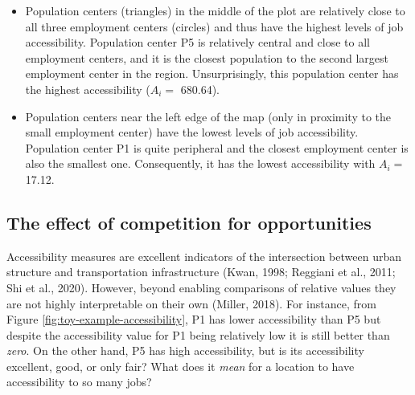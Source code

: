 \documentclass[]{elsarticle} %
\begin{document}
\begin{itemize}
\item
  Population centers (triangles) in the middle of the plot are
  relatively close to all three employment centers (circles) and thus
  have the highest levels of job accessibility. Population center P5 is
  relatively central and close to all employment centers, and it is the
  closest population to the second largest employment center in the
  region. Unsurprisingly, this population center has the highest
  accessibility (\(A_i=\) 680.64).
\item
  Population centers near the left edge of the map (only in proximity to
  the small employment center) have the lowest levels of job
  accessibility. Population center P1 is quite peripheral and the
  closest employment center is also the smallest one. Consequently, it
  has the lowest accessibility with \(A_i=\) 17.12.
\end{itemize}

\hypertarget{the-effect-of-competition-for-opportunities}{%
\subsection{The effect of competition for
opportunities}\label{the-effect-of-competition-for-opportunities}}

Accessibility measures are excellent indicators of the intersection
between urban structure and transportation infrastructure (Kwan, 1998;
Reggiani et al., 2011; Shi et al., 2020). However, beyond enabling
comparisons of relative values they are not highly interpretable on
their own (Miller, 2018). For instance, from Figure
\ref{fig:toy-example-accessibility}, P1 has lower accessibility than P5
but despite the accessibility value for P1 being relatively low it is
still better than \emph{zero}. On the other hand, P5 has high
accessibility, but is its accessibility excellent, good, or only fair?
What does it \emph{mean} for a location to have accessibility to so many
jobs?
\end{document}
